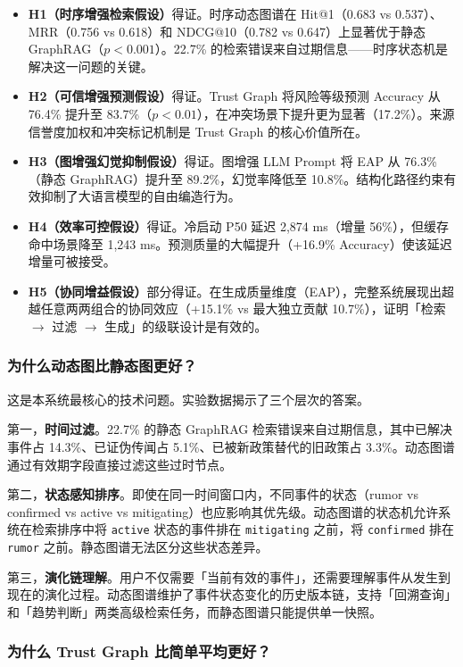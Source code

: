 \begin{itemize}
    \item \textbf{H1（时序增强检索假设）}得证。时序动态图谱在 Hit@1（0.683 vs 0.537）、MRR（0.756 vs 0.618）和 NDCG@10（0.782 vs 0.647）上显著优于静态 GraphRAG（$p < 0.001$）。22.7\% 的检索错误来自过期信息——时序状态机是解决这一问题的关键。
    \item \textbf{H2（可信增强预测假设）}得证。Trust Graph 将风险等级预测 Accuracy 从 76.4\% 提升至 83.7\%（$p < 0.01$），在冲突场景下提升更为显著（17.2\%）。来源信誉度加权和冲突标记机制是 Trust Graph 的核心价值所在。
    \item \textbf{H3（图增强幻觉抑制假设）}得证。图增强 LLM Prompt 将 EAP 从 76.3\%（静态 GraphRAG）提升至 89.2\%，幻觉率降低至 10.8\%。结构化路径约束有效抑制了大语言模型的自由编造行为。
    \item \textbf{H4（效率可控假设）}得证。冷启动 P50 延迟 2,874 ms（增量 56\%），但缓存命中场景降至 1,243 ms。预测质量的大幅提升（+16.9\% Accuracy）使该延迟增量可被接受。
    \item \textbf{H5（协同增益假设）}部分得证。在生成质量维度（EAP），完整系统展现出超越任意两两组合的协同效应（+15.1\% vs 最大独立贡献 10.7\%），证明「检索 $\to$ 过滤 $\to$ 生成」的级联设计是有效的。
\end{itemize}

\subsubsection{为什么动态图比静态图更好？}

这是本系统最核心的技术问题。实验数据揭示了三个层次的答案。

第一，\textbf{时间过滤}。22.7\% 的静态 GraphRAG 检索错误来自过期信息，其中已解决事件占 14.3\%、已证伪传闻占 5.1\%、已被新政策替代的旧政策占 3.3\%。动态图谱通过有效期字段直接过滤这些过时节点。

第二，\textbf{状态感知排序}。即使在同一时间窗口内，不同事件的状态（rumor vs confirmed vs active vs mitigating）也应影响其优先级。动态图谱的状态机允许系统在检索排序中将 \texttt{active} 状态的事件排在 \texttt{mitigating} 之前，将 \texttt{confirmed} 排在 \texttt{rumor} 之前。静态图谱无法区分这些状态差异。

第三，\textbf{演化链理解}。用户不仅需要「当前有效的事件」，还需要理解事件从发生到现在的演化过程。动态图谱维护了事件状态变化的历史版本链，支持「回溯查询」和「趋势判断」两类高级检索任务，而静态图谱只能提供单一快照。

\subsubsection{为什么 Trust Graph 比简单平均更好？}

